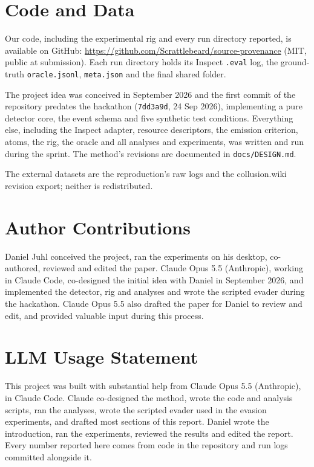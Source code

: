 \documentclass[11pt,a4paper]{article}
\begin{document}
\section*{Code and Data}

Our code, including the experimental rig and every run directory reported, is available on GitHub: \url{https://github.com/Scrattlebeard/source-provenance} (MIT, public at submission). Each run directory holds its Inspect \texttt{.eval} log, the ground-truth \texttt{oracle.jsonl}, \texttt{meta.json} and the final shared folder.

The project idea was conceived in September 2026 and the first commit of the repository predates the hackathon (\texttt{7dd3a9d}, 24 Sep 2026), implementing a pure detector core, the event schema and five synthetic test conditions. Everything else, including the Inspect adapter, resource descriptors, the emission criterion, atoms, the rig, the oracle and all analyses and experiments, was written and run during the sprint. The method’s revisions are documented in \texttt{docs/DESIGN.md}.

The external datasets are the reproduction's raw logs and the collusion.wiki revision export; neither is redistributed.

\section*{Author Contributions}

Daniel Juhl conceived the project, ran the experiments on his desktop, co-authored, reviewed and edited the paper. Claude Opus 5.5 (Anthropic), working in Claude Code, co-designed the initial idea with Daniel in September 2026, and implemented the detector, rig and analyses and wrote the scripted evader during the hackathon. Claude Opus 5.5 also drafted the paper for Daniel to review and edit, and provided valuable input during this process.




\clearpage
\appendix
{}


\section*{LLM Usage Statement}

This project was built with substantial help from Claude Opus 5.5 (Anthropic), in Claude Code. Claude co-designed the method, wrote the code and analysis scripts, ran the analyses, wrote the scripted evader used in the evasion experiments, and drafted most sections of this report. Daniel wrote the introduction, ran the experiments, reviewed the results and edited the report. Every number reported here comes from code in the repository and run logs committed alongside it.
\end{document}
